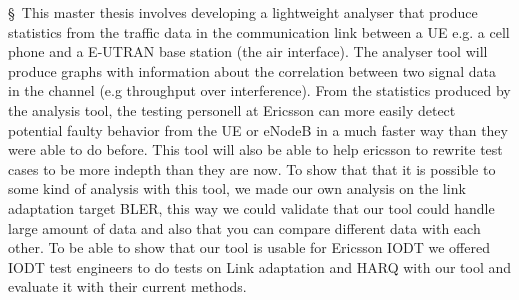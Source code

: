 \documentclass [cropmarks, frame, english, master]{idaexhibitpage}
\author {Paul Nedstrand \& Razmus Lindgren}
\begin{document}
\exhibitpagebeforeabstract 
 \S  \ This master thesis involves developing a lightweight analyser that produce statistics from the traffic data in the communication link between a UE e.g. a cell phone and a E-UTRAN base station (the air interface). The analyser tool will produce graphs with information about the correlation between two signal data in the channel (e.g throughput over interference). From the statistics produced by the analysis tool, the testing personell at Ericsson can more easily detect potential faulty behavior from the UE or eNodeB in a much faster way than they were able to do before. This tool will also be able to help ericsson to rewrite test cases to be more indepth than they are now. To show that that it is possible to some kind of analysis with this tool, we made our own analysis on the link adaptation target BLER, this way we could validate that our tool could handle large amount of data and also that you can compare different data with each other. To be able to show that our tool is usable for Ericsson IODT we offered IODT test engineers to do tests on Link adaptation and HARQ with our tool and evaluate it with their current methods. 
\exhibitpageafterabstract 
\end{document}
